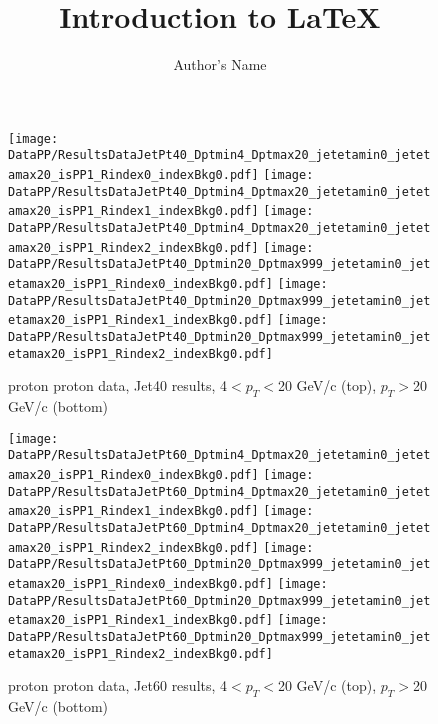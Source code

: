 \documentclass{article}
\begin{document}
\title{Introduction to \LaTeX{}}
\author{Author's Name}

\maketitle

\begin{figure}
    \centering
    \texttt{[image: DataPP/ResultsDataJetPt40\_Dptmin4\_Dptmax20\_jetetamin0\_jetetamax20\_isPP1\_Rindex0\_indexBkg0.pdf]}
    \texttt{[image: DataPP/ResultsDataJetPt40\_Dptmin4\_Dptmax20\_jetetamin0\_jetetamax20\_isPP1\_Rindex1\_indexBkg0.pdf]}
    \texttt{[image: DataPP/ResultsDataJetPt40\_Dptmin4\_Dptmax20\_jetetamin0\_jetetamax20\_isPP1\_Rindex2\_indexBkg0.pdf]}
    \texttt{[image: DataPP/ResultsDataJetPt40\_Dptmin20\_Dptmax999\_jetetamin0\_jetetamax20\_isPP1\_Rindex0\_indexBkg0.pdf]}
    \texttt{[image: DataPP/ResultsDataJetPt40\_Dptmin20\_Dptmax999\_jetetamin0\_jetetamax20\_isPP1\_Rindex1\_indexBkg0.pdf]}
    \texttt{[image: DataPP/ResultsDataJetPt40\_Dptmin20\_Dptmax999\_jetetamin0\_jetetamax20\_isPP1\_Rindex2\_indexBkg0.pdf]}
    \caption{proton proton data, Jet40 results, 4$<p_{T}<$20 GeV/c (top), $p_{T}>$20 GeV/c (bottom) }
    \label{simulationfigure}
\end{figure}


\begin{figure}
    \centering
    \texttt{[image: DataPP/ResultsDataJetPt60\_Dptmin4\_Dptmax20\_jetetamin0\_jetetamax20\_isPP1\_Rindex0\_indexBkg0.pdf]}
    \texttt{[image: DataPP/ResultsDataJetPt60\_Dptmin4\_Dptmax20\_jetetamin0\_jetetamax20\_isPP1\_Rindex1\_indexBkg0.pdf]}
    \texttt{[image: DataPP/ResultsDataJetPt60\_Dptmin4\_Dptmax20\_jetetamin0\_jetetamax20\_isPP1\_Rindex2\_indexBkg0.pdf]}
    \texttt{[image: DataPP/ResultsDataJetPt60\_Dptmin20\_Dptmax999\_jetetamin0\_jetetamax20\_isPP1\_Rindex0\_indexBkg0.pdf]}
    \texttt{[image: DataPP/ResultsDataJetPt60\_Dptmin20\_Dptmax999\_jetetamin0\_jetetamax20\_isPP1\_Rindex1\_indexBkg0.pdf]}
    \texttt{[image: DataPP/ResultsDataJetPt60\_Dptmin20\_Dptmax999\_jetetamin0\_jetetamax20\_isPP1\_Rindex2\_indexBkg0.pdf]}
    \caption{proton proton data, Jet60 results, 4$<p_{T}<$20 GeV/c (top), $p_{T}>$20 GeV/c (bottom) }
    \label{simulationfigure}
\end{figure}
\end{document}
